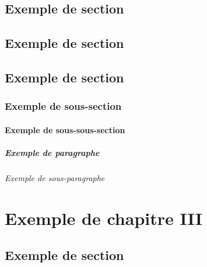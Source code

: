 \documentclass[precis,colourall]{frenchlaw}
\begin{document}
\subpara[A subpara]


 \lipsum[2]

 \lipsum[3]

\section{Exemple de section}

 \lipsum[4]

 \lipsum[5]

 \lipsum[6]

\section{Exemple de section}

\section{Exemple de section}

\subsection{Exemple de sous-section}

\subsubsection{Exemple de sous-sous-section}

\paragraph{Exemple de paragraphe}

\subparagraph{Exemple de sous-paragraphe}

\chapter{Exemple de chapitre III}

\section{Exemple de section}
\end{document}
